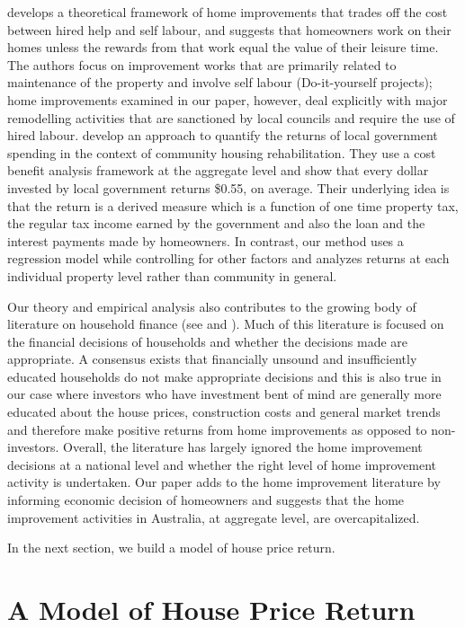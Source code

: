\documentclass[AEJ,reqno, draftmode]{AEA} %
\begin{document}
\citet{mendelsohn1977empirical} develops a theoretical framework of home improvements that trades off the cost between hired help and self labour, and suggests that homeowners work on their homes unless the rewards from that work equal the value of their leisure time. The authors focus on improvement works that are primarily related to maintenance of the property and involve self labour (Do-it-yourself projects); home improvements examined in our paper, however, deal explicitly with major remodelling activities that are sanctioned by local councils and require the use of hired labour. \citet{simons2009housing} develop an approach to quantify the returns of local government spending in the context of community housing rehabilitation. They use a cost benefit analysis framework at the aggregate level and show that every dollar invested by local government returns \$0.55, on average. Their underlying idea is that the return is a derived measure which is a function of one time property tax, the regular tax income earned by the government and also the loan and the interest payments made by homeowners. In contrast, our method uses a regression model while controlling for other factors and analyzes returns at each individual property level rather than community in general.

Our theory and empirical analysis also contributes to the growing body of literature on household finance (see \cite{barber2011behavior} and \cite{campbell2006household}). Much of this literature is focused on the financial decisions of households and whether the decisions made are appropriate. A consensus exists that financially unsound and insufficiently educated households do not make appropriate decisions and this is also true in our case where investors who have investment bent of mind are generally more educated about the house prices, construction costs and general market trends and therefore make positive returns from home improvements as opposed to non-investors. Overall, the literature has largely ignored the home improvement decisions at a national level and whether the right level of home improvement activity is undertaken. Our paper adds to the home improvement literature by informing economic decision of homeowners and suggests that the home improvement activities in Australia, at aggregate level, are overcapitalized.

In the next section, we build a model of house price return.

\section{A Model of House Price Return}
\end{document}
